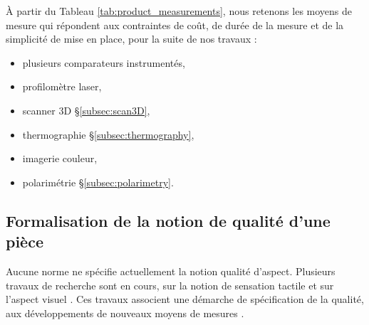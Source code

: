 À partir du Tableau \ref{tab:product_measurements}, nous retenons les moyens de mesure qui répondent aux contraintes de coût, de durée de la mesure et de la simplicité de mise en place, pour la suite de nos travaux :
\begin{itemize}
	\item plusieurs comparateurs instrumentés,
	\item profilomètre laser,
	\item scanner 3D §\ref{subsec:scan3D},
	\item thermographie §\ref{subsec:thermography},
	\item imagerie couleur,
	\item polarimétrie §\ref{subsec:polarimetry}.
\end{itemize}
%
%
%

\subsection{Formalisation de la notion de qualité d'une pièce}
Aucune norme ne spécifie actuellement la notion qualité d'aspect.
Plusieurs travaux de recherche sont en cours, sur la notion de sensation tactile \cite{bruno_albert_formalisation_2016, albert_generic_2016, albert_smart_2017, albert_smart_2019, albert_maitrise_2019} et sur l'aspect visuel \cite{desage_syntactic_2015}.
Ces travaux associent une démarche de spécification de la qualité, aux développements de nouveaux moyens de mesures \cite{desage_constraints_2015, pitard_metrologie_2016, lacombe_exploitation_2018a}.

